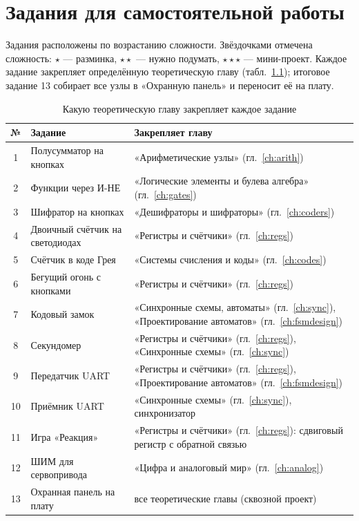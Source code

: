\chapter{Задания для самостоятельной работы}
\label{ch:tasks}

Задания расположены по возрастанию сложности. Звёздочками отмечена
сложность: \textcolor{FpgaOrange}{$\star$} --- разминка,
\textcolor{FpgaOrange}{$\star\star$} --- нужно подумать,
\textcolor{FpgaOrange}{$\star\star\star$} --- мини-проект. Каждое задание закрепляет
определённую теоретическую главу (табл.~\ref{tab:task-map}); итоговое задание
13 собирает все узлы в «Охранную панель» и переносит её на плату.

\begin{table}[H]
\centering
\caption{Какую теоретическую главу закрепляет каждое задание}
\label{tab:task-map}
\small
\begin{tabularx}{\textwidth}{c X X}
\toprule
\textbf{№} & \textbf{Задание} & \textbf{Закрепляет главу} \\
\midrule
1  & Полусумматор на кнопках & «Арифметические узлы» (гл.~\ref{ch:arith}) \\
2  & Функции через И-НЕ & «Логические элементы и булева алгебра» (гл.~\ref{ch:gates}) \\
3  & Шифратор на кнопках & «Дешифраторы и шифраторы» (гл.~\ref{ch:coders}) \\
4  & Двоичный счётчик на светодиодах & «Регистры и счётчики» (гл.~\ref{ch:regs}) \\
5  & Счётчик в коде Грея & «Системы счисления и коды» (гл.~\ref{ch:codes}) \\
6  & Бегущий огонь с кнопками & «Регистры и счётчики» (гл.~\ref{ch:regs}) \\
7  & Кодовый замок & «Синхронные схемы, автоматы» (гл.~\ref{ch:sync}), «Проектирование автоматов» (гл.~\ref{ch:fsmdesign}) \\
8  & Секундомер & «Регистры и счётчики» (гл.~\ref{ch:regs}), «Синхронные схемы» (гл.~\ref{ch:sync}) \\
9  & Передатчик UART & «Регистры и счётчики» (гл.~\ref{ch:regs}), «Проектирование автоматов» (гл.~\ref{ch:fsmdesign}) \\
10 & Приёмник UART & «Синхронные схемы» (гл.~\ref{ch:sync}), синхронизатор \\
11 & Игра «Реакция» & «Регистры и счётчики» (гл.~\ref{ch:regs}): сдвиговый регистр с обратной связью \\
12 & ШИМ для сервопривода & «Цифра и аналоговый мир» (гл.~\ref{ch:analog}) \\
13 & Охранная панель на плату & все теоретические главы (сквозной проект) \\
\bottomrule
\end{tabularx}
\end{table}

